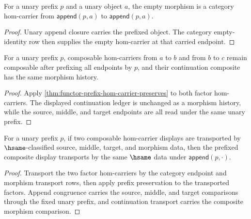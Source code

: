 \begin{theorem}
\label{thm:functor-prefix-hom-carrier-identity-closed}
For a unary prefix $p$ and a unary object $a$, the empty morphism is a category
hom-carrier from $\mathsf{append}(p,a)$ to $\mathsf{append}(p,a)$.
\end{theorem}
\begin{proof}
Unary append closure carries the prefixed object. The category empty-identity
row then supplies the empty hom-carrier at that carried endpoint.
\end{proof}

\begin{theorem}
\label{thm:functor-prefix-hom-carrier-comp-preserves}
For a unary prefix $p$, composable hom-carriers from $a$ to $b$ and from $b$ to
$c$ remain composable after prefixing all endpoints by $p$, and their
continuation composite has the same morphism history.
\end{theorem}
\begin{proof}
Apply \autoref{thm:functor-prefix-hom-carrier-preserves} to both factor
hom-carriers. The displayed continuation ledger is unchanged as a morphism
history, while the source, middle, and target endpoints are all read under the
same unary prefix.
\end{proof}

\begin{theorem}
\label{thm:functor-prefix-hom-carrier-comp-hsame-transport}
For a unary prefix $p$, if two composable hom-carrier displays are transported
by $\hsame$-classified source, middle, target, and morphism data, then the
prefixed composite display transports by the same $\hsame$ data under
$\mathsf{append}(p,\cdot)$.
\end{theorem}
\begin{proof}
Transport the two factor hom-carriers by the category endpoint and morphism
transport rows, then apply prefix preservation to the transported factors.
Append congruence carries the source, middle, and target comparisons through
the fixed unary prefix, and continuation transport carries the composite
morphism comparison.
\end{proof}

